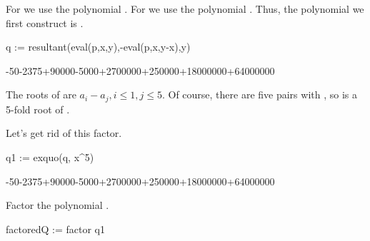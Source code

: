 {{{{{{{{{{{{{{{{{{\begin{xtc}
\begin{xtccomment}
For  we use the polynomial .
For  we use the polynomial .
Thus, the polynomial we  first construct is
.
\end{xtccomment}
\begin{spadsrc}
q := resultant(eval(p,x,y),-eval(p,x,y-x),y) 
\end{spadsrc}
\begin{TeXOutput}
\begin{fricasmath}{2}
-{50\TIMES {}}-{2375\TIMES {}}+90000\TIMES {}-{5000\TIMES {}}+2700000\TIMES {}+250000\TIMES {}+18000000\TIMES {}+64000000\TIMES {}%
\end{fricasmath}
\end{TeXOutput}
\end{xtc}
%
The roots of  are
$a_i - a_j, i \leq 1, j \leq 5$.
Of course, there are five pairs  with ,
so  is a 5-fold root of .
%
\begin{xtc}
\begin{xtccomment}
Let's get rid of this factor.
\end{xtccomment}
\begin{spadsrc}
q1 := exquo(q, x^5) 
\end{spadsrc}
\begin{TeXOutput}
\begin{fricasmath}{3}
-{50\TIMES {}}-{2375\TIMES {}}+90000\TIMES {}-{5000\TIMES {}}+2700000\TIMES {}+250000\TIMES {}+18000000\TIMES {}+64000000%
\end{fricasmath}
\end{TeXOutput}
\end{xtc}
\begin{xtc}
\begin{xtccomment}
Factor the polynomial .
\end{xtccomment}
\begin{spadsrc}
factoredQ := factor q1 
\end{spadsrc}

\end{xtc}}}}}}}}}}}}}}}}}}}
